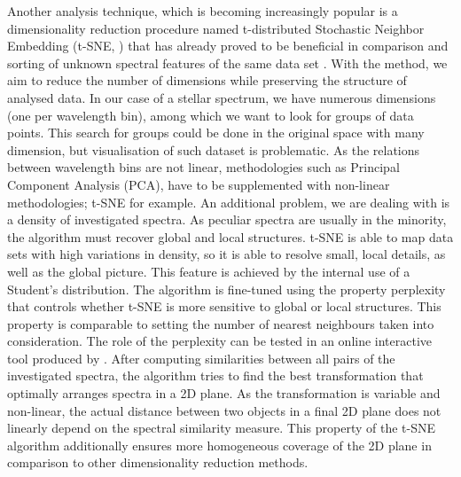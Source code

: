 Another analysis technique, which is becoming increasingly popular is a dimensionality reduction procedure named t-distributed Stochastic Neighbor Embedding (t-SNE, \cite{van2008visualizing}) that has already proved to be beneficial in comparison and sorting of unknown spectral features of the same data set \cite{2017ApJS..228...24T}. With the method, we aim to reduce the number of dimensions while preserving the structure of analysed data. In our case of a stellar spectrum, we have numerous dimensions (one per wavelength bin), among which we want to look for groups of data points. This search for groups could be done in the original space with many dimension, but visualisation of such dataset is problematic. As the relations between wavelength bins are not linear, methodologies such as Principal Component Analysis (PCA), have to be supplemented with non-linear methodologies; t-SNE for example. An additional problem, we are dealing with is a density of investigated spectra. As peculiar spectra are usually in the minority, the algorithm must recover global and local structures. t-SNE is able to map data sets with high variations in density, so it is able to resolve small, local details, as well as the global picture. This feature is achieved by the internal use of a Student's distribution. The algorithm is fine-tuned using the property perplexity that controls whether t-SNE is more sensitive to global or local structures. This property is comparable to setting the number of nearest neighbours taken into consideration. The role of the perplexity can be tested in an online interactive tool produced by \citet{wattenberg2016how}. After computing similarities between all pairs of the investigated spectra, the algorithm tries to find the best transformation that optimally arranges spectra in a 2D plane. As the transformation is variable and non-linear, the actual distance between two objects in a final 2D plane does not linearly depend on the spectral similarity measure. This property of the t-SNE algorithm additionally ensures more homogeneous coverage of the 2D plane in comparison to other dimensionality reduction methods.

